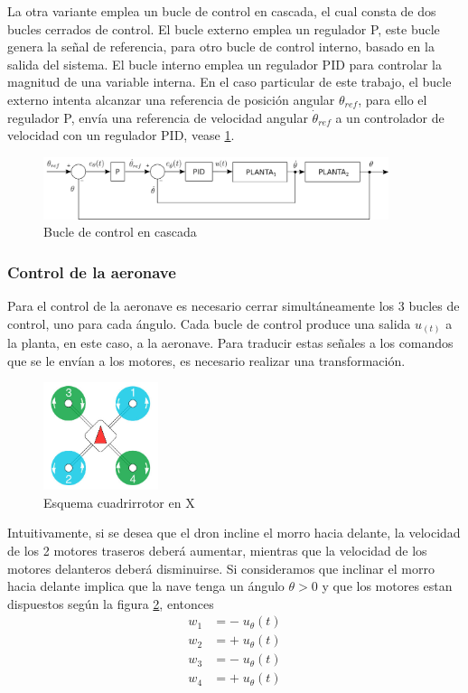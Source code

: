 La otra variante emplea un bucle de control en cascada, el cual consta de dos bucles cerrados de control. El bucle externo emplea un regulador P, este bucle genera la señal de referencia, para otro bucle de control interno, basado en la salida del sistema. El bucle interno emplea un regulador PID para controlar la magnitud de una variable interna. En el caso particular de este trabajo, el bucle externo intenta alcanzar una referencia de posición angular $\theta_{ref}$, para ello el regulador P, envía una referencia de velocidad angular $\dot \theta_{ref}$ a un controlador de velocidad con un regulador PID, vease \cref{PID_cascade_loop}.


\begin{figure}[htb!]
	\centering
	\includegraphics[width=0.9\textwidth]{background/PID_cascade_loop}
	\caption{Bucle de control en cascada}
	\label{PID_cascade_loop}
\end{figure}


\subsubsection{Control de la aeronave }
Para el control de la aeronave es necesario cerrar simultáneamente los 3 bucles de control, uno para cada ángulo. Cada bucle de control produce una salida $u_(t)$ a la planta, en este caso, a la aeronave. Para traducir estas señales a los comandos que se le envían a los motores, es necesario realizar una transformación. 


\begin{figure}[htb!]
	\centering
	\includegraphics[width=0.3\textwidth]{introduccion/cuadrirrotorX.jpeg}
	\caption{Esquema cuadrirrotor en X}
	\label{Drone_en_X_Q}
\end{figure}


Intuitivamente, si se desea que el dron incline el morro hacia delante, la velocidad de los 2 motores traseros deberá aumentar, mientras que la velocidad de los motores delanteros deberá disminuirse. Si consideramos que inclinar el morro hacia delante implica que la nave tenga un ángulo $\theta > 0$ y que los motores estan dispuestos según la figura \ref{Drone_en_X_Q}, entonces 
\begin{align*}
	w_1 &= -\; u_\theta(t)\\
	w_2 &= +\; u_\theta(t)\\
	w_3 &= -\; u_\theta(t)\\
	w_4 &= +\; u_\theta(t)
\end{align*}

